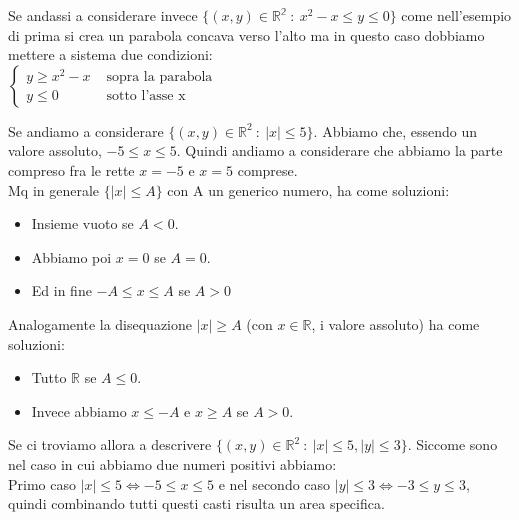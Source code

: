 \begin{example}\label{ess-10}
Se andassi a considerare invece $\{(x,y) \in \mathbb{R^2} \::\: x^2 - x \leq y \leq 0\}$ come nell'esempio di prima si crea un parabola concava verso l'alto ma in questo caso dobbiamo mettere a sistema due condizioni:\\
$\begin{cases}y \geq x^2 - x & \text{ sopra la parabola } \\ y \leq 0 & \text{ sotto l'asse x }\end{cases}$
\end{example}

\begin{example}\label{ess-11}
Se andiamo a considerare $\{(x,y) \in \mathbb{R}^2 \::\:  |x| \leq 5\}$. Abbiamo che, essendo un valore assoluto, $-5 \leq x \leq 5$. Quindi andiamo a considerare che abbiamo la parte compreso fra le rette $x = -5$ e $x = 5$ comprese.\\
Mq in generale $\{|x| \leq A\}$ con A un generico numero, ha come soluzioni:
\begin{itemize}
    \item Insieme vuoto se $A < 0$.
    \item Abbiamo poi $x = 0$ se $A = 0$.
    \item Ed in fine $-A \leq x \leq A$ se $A > 0$
\end{itemize}
Analogamente la disequazione $|x| \geq A$ (con $x \in \mathbb{R}$, i valore assoluto) ha come soluzioni:
\begin{itemize}
    \item Tutto $\mathbb{R}$ se $A \leq 0$.
    \item Invece abbiamo $x \leq -A$ e $x \geq A$ se $A > 0$.
\end{itemize}
\end{example}

\begin{example}\label{ess-12}
Se ci troviamo allora a descrivere $\{(x,y) \in \mathbb{R}^2 \::\: |x| \leq 5, |y| \leq 3\}$. Siccome sono nel caso in cui abbiamo due numeri positivi abbiamo:\\
Primo caso $|x| \leq 5 \Longleftrightarrow -5 \leq x \leq 5$ e nel secondo caso $|y| \leq 3 \Longleftrightarrow -3 \leq y \leq 3$, quindi combinando tutti questi casti risulta un area specifica.
\end{example}

